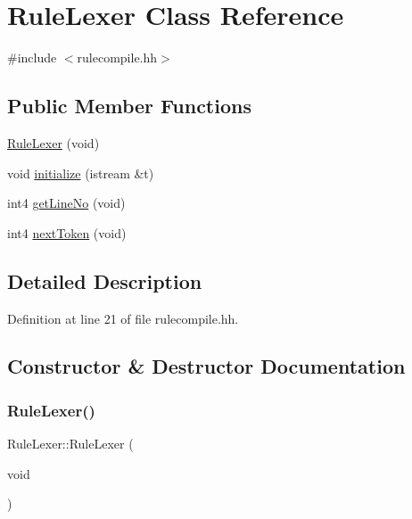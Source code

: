 \hypertarget{class_rule_lexer}{}\section{Rule\+Lexer Class Reference}
\label{class_rule_lexer}


{\ttfamily \#include $<$rulecompile.\+hh$>$}

\subsection*{Public Member Functions}
\begin{DoxyCompactItemize}
\item 
\mbox{\hyperlink{class_rule_lexer_a98bd3c98c1f969833bcfd0c8004898b7}{Rule\+Lexer}} (void)
\item 
void \mbox{\hyperlink{class_rule_lexer_a8db7e5c6f395d5efaf88deb517e6d968}{initialize}} (istream \&t)
\item 
int4 \mbox{\hyperlink{class_rule_lexer_a5560d47807583bf7e5483a061cad1918}{get\+Line\+No}} (void)
\item 
int4 \mbox{\hyperlink{class_rule_lexer_ad396de215b67472a4c77fe5c591599f0}{next\+Token}} (void)
\end{DoxyCompactItemize}


\subsection{Detailed Description}


Definition at line 21 of file rulecompile.\+hh.



\subsection{Constructor \& Destructor Documentation}
\mbox{\label{class_rule_lexer_a98bd3c98c1f969833bcfd0c8004898b7}} 
\subsubsection{\texorpdfstring{RuleLexer()}{RuleLexer()}}
{\footnotesize\ttfamily Rule\+Lexer\+::\+Rule\+Lexer (\begin{DoxyParamCaption}\item[{void}]{ }\end{DoxyParamCaption})}



